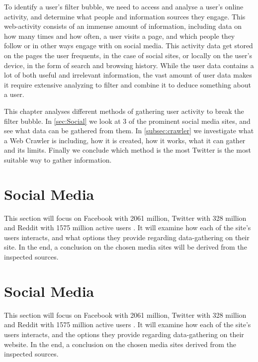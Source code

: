 
To identify a user's filter bubble, we need to access and analyse a user's
online activity, and determine what people and information sources they engage. This
web-activity consists of an immense amount of information, including data on how
many times and how often, a user visits a page, and which people they follow or
in other ways engage with on social media. This activity data get stored on the
pages the user frequents, in the case of social sites, or locally on the user's
device, in the form of search and browsing history. While the user data contains
a lot of both useful and irrelevant information, the vast amount of user data
makes it require extensive analyzing to filter and combine it to deduce
something about a user.\nl

This chapter analyses different methods of gathering user activity to break the
filter bubble. In \autoref{sec:Social} we look at 3 of the prominent social
media sites, and see what data can be gathered from them. In
\autoref{subsec:crawler} we investigate what a Web Crawler is including, how it
is created, how it works, what it can gather and its limits. Finally we 
conclude which method is the most Twitter is the most suitable way to gather
information.

\section{Social Media}
This section will focus on Facebook with 2061 million, Twitter with 328 million
and Reddit with 1575 million active users \citep{SocialMediaStats, RedditStats}.
It will examine how each of the site's users interacts, and what options they
provide regarding data-gathering on their site. In the end, a conclusion on the
chosen media sites will be derived from the inspected sources.
\section{Social Media}\label{sec:Social}
This section will focus on Facebook with 2061 million, Twitter with 328 million
and Reddit with 1575 million active users \citep{SocialMediaStats,
AdvertiseOnReddit}. It will examine how each of the site's users interacts, and
the options they provide regarding data-gathering on their website. In the end,
a conclusion on the chosen media sites derived from the inspected sources.

